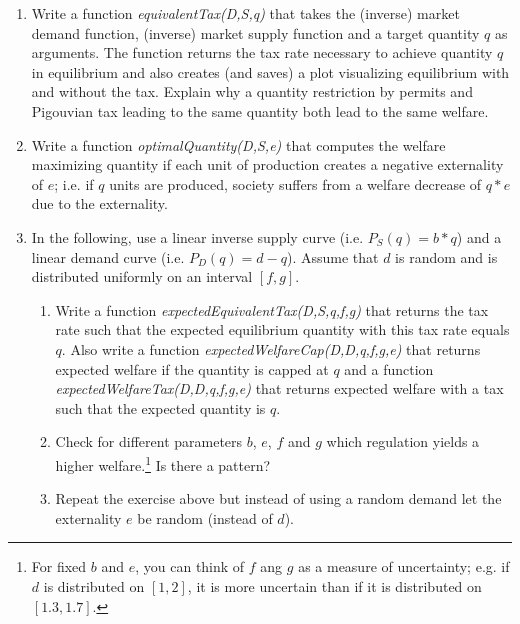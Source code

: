 \documentclass[a4paper,12pt]{article}
\begin{document}
\begin{enumerate}
\item Write a function \emph{equivalentTax(D,S,q)} that takes the (inverse) market demand function, (inverse) market supply function and a target quantity $q$ as arguments. The function returns the tax rate necessary to achieve quantity $q$ in equilibrium and also creates (and saves) a plot visualizing equilibrium with and without the tax. Explain why a quantity restriction by permits and Pigouvian tax leading to the same quantity both lead to the same welfare.
\item Write a function \emph{optimalQuantity(D,S,e)} that computes the welfare maximizing quantity if each unit of production creates a negative externality of $e$; i.e. if $q$ units are produced, society suffers from a welfare decrease of $q*e$ due to the externality.
\item In the following, use a linear inverse supply curve (i.e. $P_S(q)=b*q$) and a linear demand curve (i.e. $P_D(q)=d-q$). Assume that $d$ is random and is distributed uniformly on an interval $[f,g]$.
  \begin{enumerate}
  \item Write a function \emph{expectedEquivalentTax(D,S,q,f,g)} that returns the tax rate such that the expected equilibrium quantity with this tax rate equals $q$. Also write a function \emph{expectedWelfareCap(D,D,q,f,g,e)} that returns expected welfare if the quantity is capped at $q$ and a function \emph{expectedWelfareTax(D,D,q,f,g,e)} that returns expected welfare with a tax such that the expected quantity is $q$.
  \item Check for different parameters $b$, $e$, $f$ and $g$ which regulation yields a higher welfare.\footnote{For fixed $b$ and $e$, you can think of $f$ ang $g$ as a measure of uncertainty; e.g. if $d$ is distributed on $[1,2]$, it is more uncertain than if it is distributed on $[1.3,1.7]$. } Is there a pattern?
  \item Repeat the exercise above but instead of using a random demand let the externality $e$ be random (instead of $d$).  
  \end{enumerate}
\end{enumerate}
\end{document}
